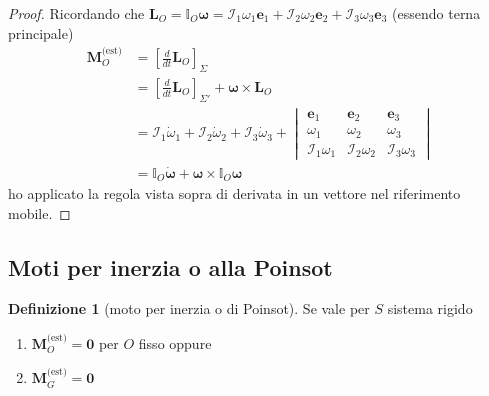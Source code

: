 \documentclass[a4paper,10pt]{article}
\theoremstyle{definition}
\newcommand{\bv}{\boldsymbol} %
\theoremstyle{indentdefinition}
\newtheorem{defn}{Definizione}[section]
\theoremstyle{indenttheorem}
\theoremstyle{myremark}
\theoremstyle{indentgeneral}
\begin{document}
\begin{proof}
Ricordando che $\boldsymbol{L}_{O}=\mathbb{I}_{O}\boldsymbol{\omega}=\mathcal{I}_{1}\omega_{1}\boldsymbol{e}_{1}+\mathcal{I}_{2}\omega_{2}\boldsymbol{e}_{2}+\mathcal{I}_{3}\omega_{3}\boldsymbol{e}_{3}$  (essendo terna principale)
\begin{align*}
\boldsymbol{M}_{O}^{\text{(est)}} &=\left[\frac{d}{dt}\boldsymbol{L}_{O}\right]_{\Sigma} \\
&=\left[\frac{d}{dt}\boldsymbol{L}_{O}\right]_{\Sigma'}+\boldsymbol{\omega}\times\boldsymbol{L}_{O} \\
&=\mathcal{I}_{1}\dot{\omega}_{1}+\mathcal{I}_{2}\dot{\omega}_{2}+\mathcal{I}_{3}\dot{\omega}_{3}+\begin{vmatrix}\boldsymbol{e}_{1} & \boldsymbol{e}_{2} & \boldsymbol{e}_{3}\\
\omega_{1} & \omega_{2} & \omega_{3}\\
\mathcal{I}_{1}\omega_{1} & \mathcal{I}_{2}\omega_{2} & \mathcal{I}_{3}\omega_{3}
\end{vmatrix} \\
&=\mathbb{I}_O\dot{\bv{\omega}}+\bv{\omega}\times\mathbb{I}_O\bv{\omega}
\end{align*}
ho applicato la regola vista sopra di derivata in un vettore nel riferimento mobile.
\end{proof}


\subsection{Moti per inerzia o alla Poinsot}
\begin{defn}[moto per inerzia o di Poinsot]
\label{def:moto-Poinsot}Se vale per $S$ sistema rigido 
\begin{enumerate}
    \item $\boldsymbol{M}_{O}^{\text{(est)}}=\boldsymbol{0}$
per $O$ fisso oppure
\item  $\boldsymbol{M}_{G}^{\text{(est)}}=\boldsymbol{0}$
\end{enumerate}
\end{defn}
\end{document}
